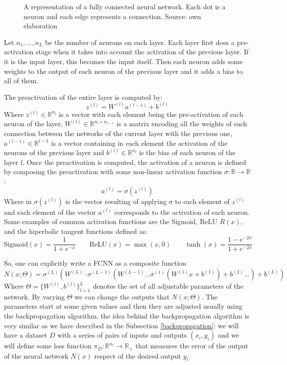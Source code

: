 \documentclass[11pt,a4paper,openright,oneside]{book}
\numberwithin{equation}{section}
\begin{document}
{\begin{figure}[H]

    \caption{A representation of a fully connected neural network. Each dot is a neuron and each edge represents a connection. Source: own elaboration}
    \label{fig:fcnn}
\end{figure}

Let $n_1, \dots, n_L$ be the number of neurons on each layer. Each layer first does a pre-activation stage when it takes into account
the activation of the previous layer. If it is the input layer, this becomes the input itself. Then
each neuron adds some weights to the output of each neuron of the previous layer and it adds a bias to all of them.

The preactivation of the entire layer is computed by:
$$z^{(l)} = W^{(l)} a^{(l - 1)} + b^{(l)}$$
Where $z^{(l)} \in \mathbb{R}^{n_l}$ is a vector with each element being
the pre-activation of each neuron of the layer, $W^{(l)} \in \mathbb{R}^{n_l \times n_{l-1}}$ is a matrix encoding all the weights of each connection
between the networks of the current layer with the previous one,
$a^{(l - 1)} \in \mathbb{R}^{l - 1}$ is a vector containing in each element the activation of the neurons of the previous layer
and $b^{(l)} \in \mathbb{R}^{n_l}$ is the bias of each neuron of the layer $l$. Once the preactivation is computed, the activation of a neuron is defined by composing the preactivation
with some non-linear activation function $\sigma : \mathbb{R} \rightarrow \mathbb{R}$:
$$a^{(l)} = \sigma(z^{(l)})$$
Where in $\sigma(z^{(l)})$ is the vector resulting of applying $\sigma$ to each element of $z^{(l)}$ and each element
of the vector $a^{(l)}$ corresponds to the activation of each neuron. Some examples of common activation functions are
the Sigmoid, ReLU $R(x)$, and the hiperbolic tangent functions defined as:
$$\text{Sigmoid}(x) = \frac{1}{1 + e^{-x}} \qquad \text{ReLU}(x) = \max(x, 0) \qquad \tanh(x) = \frac{1-e^{-2x}}{1+e^{-2x}}$$

So, one can explicitly write a \gls{FCNN} as a composite function
$$N(x; \Theta) = \sigma^{(L)}(W^{(L)} \cdot \sigma^{(L - 1)}( W^{(L-1)} \dots \sigma^{(1)}(W^{(1)} x + b^{(1)}) + b^{(2)} \dots ) + b^{(L)})$$
Where $\Theta = \{W^{(l)}, b^{(l)}\}_{l=1}^L$ denotes the set of all adjustable parameters of the network.
By varying $\Theta$ we can change the outputs that $N(x; \Theta)$. The
parameters start at some given values and then they are adjusted usually using the backpropagation algorithm, the idea behind the backpropagation
algorithm is very similar as we have  
described in the Subsection \ref{backpropagation}: we will have a dataset $D$ with a series of pairs of inputs and outputs $(x_i, y_i)$ and we
will define some loss function $\pi_D : \mathbb{R}^{n_l} \rightarrow \mathbb{R}_+$ that measures the error of the output of the neural network $N(x)$ respect of the desired output $y_i$.

}
\end{document}
